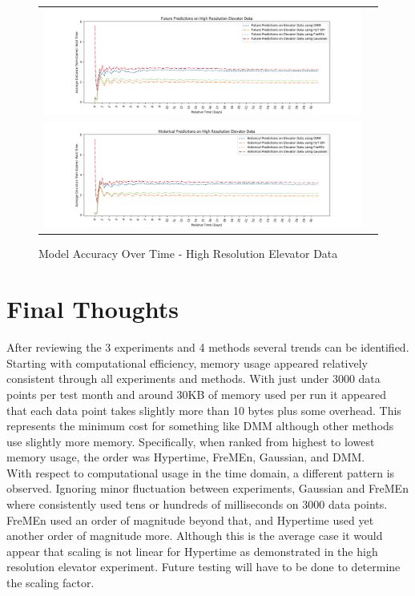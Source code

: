 \begin{center}
\begin{figure}[!Hp]
  \begin{tabular}{cc}
    {\includegraphics[width = 6in]{images/results/Future_Predictions_on_High_Resolution_Elevator_Data.png}} \\
    {\includegraphics[width = 6in]{images/results/Historical_Predictions_on_High_Resolution_Elevator_Data.png}} \\
  \end{tabular}
  \caption{Model Accuracy Over Time - High Resolution Elevator Data}
  \label{figure:Model_Accuracy_Over_Time_High_Resolution_Elevator_Data}
\end{figure}
\end{center}


\section{ Final Thoughts }

After reviewing the 3 experiments and 4 methods several trends can be
identified. Starting with computational efficiency, memory usage appeared
relatively consistent through all experiments and methods. With just under 3000
data points per test month and around 30KB of memory used per run
it appeared that each data point takes slightly more than 10 bytes plus
some overhead. This represents the minimum cost for something like DMM although
other methods use slightly more memory. Specifically, when ranked from highest to lowest memory usage,
the order was Hypertime, FreMEn, Gaussian, and DMM. \\

With respect to computational usage in the time domain, a different pattern is
observed. Ignoring minor fluctuation between experiments, Gaussian and FreMEn
where consistently used tens or hundreds of milliseconds on 3000 data points.
FreMEn used an order of magnitude beyond that, and Hypertime used yet another
order of magnitude more. Although this is the average case it would appear that
scaling is not linear for Hypertime as demonstrated in the high resolution
elevator experiment. Future testing will have to be done to determine the
scaling factor. \\

